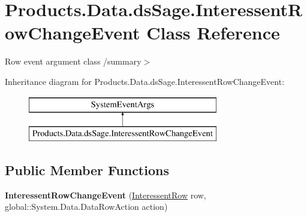 \hypertarget{class_products_1_1_data_1_1ds_sage_1_1_interessent_row_change_event}{}\section{Products.\+Data.\+ds\+Sage.\+Interessent\+Row\+Change\+Event Class Reference}
\label{class_products_1_1_data_1_1ds_sage_1_1_interessent_row_change_event}


Row event argument class /summary$>$  


Inheritance diagram for Products.\+Data.\+ds\+Sage.\+Interessent\+Row\+Change\+Event\+:\begin{figure}[H]
\begin{center}
\leavevmode
\includegraphics[height=2.000000cm]{class_products_1_1_data_1_1ds_sage_1_1_interessent_row_change_event}
\end{center}
\end{figure}
\subsection*{Public Member Functions}
\begin{DoxyCompactItemize}
\item 
{\bfseries Interessent\+Row\+Change\+Event} (\hyperlink{class_products_1_1_data_1_1ds_sage_1_1_interessent_row}{Interessent\+Row} row, global\+::\+System.\+Data.\+Data\+Row\+Action action)\hypertarget{class_products_1_1_data_1_1ds_sage_1_1_interessent_row_change_event_aac34a815ed275ca6484b042e163e42e8}{}\label{class_products_1_1_data_1_1ds_sage_1_1_interessent_row_change_event_aac34a815ed275ca6484b042e163e42e8}

\end{DoxyCompactItemize}
